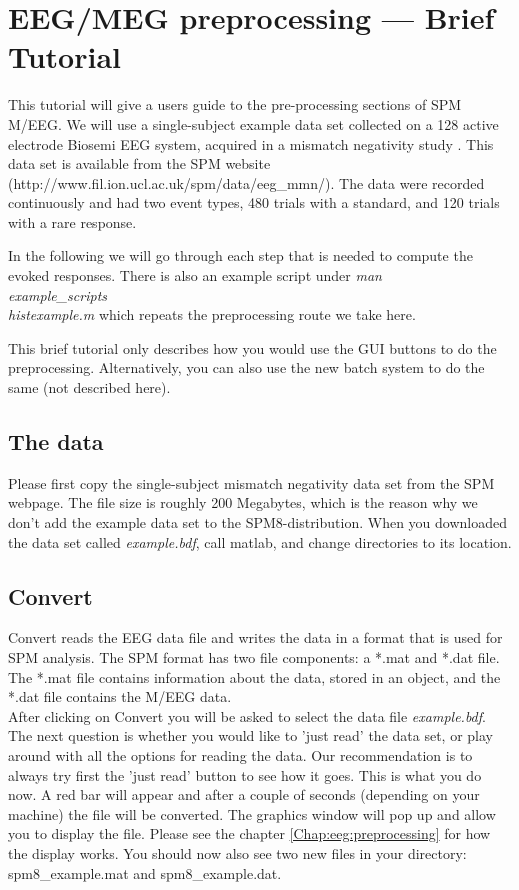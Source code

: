 \chapter{EEG/MEG preprocessing --- Brief Tutorial}
\label{ch:eeg_tutorial}
This tutorial will give a users guide to the pre-processing sections
of SPM M/EEG. We will use a single-subject example data set collected on a 128 active
electrode Biosemi EEG system, acquired in a mismatch negativity study \cite{mg_dcm_repro}. This data set is available from the SPM website (http://www.fil.ion.ucl.ac.uk/spm/data/eeg\_mmn/). The data were recorded continuously and had two event types, 480 trials with a standard, and 120 trials with a rare response.

In the following we will go through each step that is needed to compute the evoked responses. There is also an example script under \textit{man\\example\_scripts\\histexample.m} which repeats the preprocessing route we take here.

This brief tutorial only describes how you would use the GUI buttons to do the preprocessing. Alternatively, you can also use the new batch system to do the same (not described here).

\section{The data}
Please first copy the single-subject mismatch negativity data set from the SPM webpage. The file size is roughly 200 Megabytes, which is the reason why we don't add the example data set to the SPM8-distribution. When you downloaded the data set called \textit{example.bdf}, call matlab, and change directories to its location.

\section{Convert}
Convert reads the EEG data file and writes the data in a format that
is used for SPM analysis. The SPM format has two file components: a *.mat
and *.dat file. The *.mat file contains information about the data, stored in an object, and the *.dat file contains the M/EEG data.\\

After clicking on Convert you will be asked to select the data file \textit{example.bdf}. The next question is whether you would like to 'just read' the data set, or play around with all the options for reading the data. Our recommendation is to always try first the 'just read' button to see how it goes. This is what you do now. A red bar will appear and after a couple of seconds (depending on your machine) the file will be converted. The graphics window will pop up and allow you to display the file. Please see the chapter \ref{Chap:eeg:preprocessing} for how the display works. You should now also see two new files in your directory: spm8\_example.mat and spm8\_example.dat.


